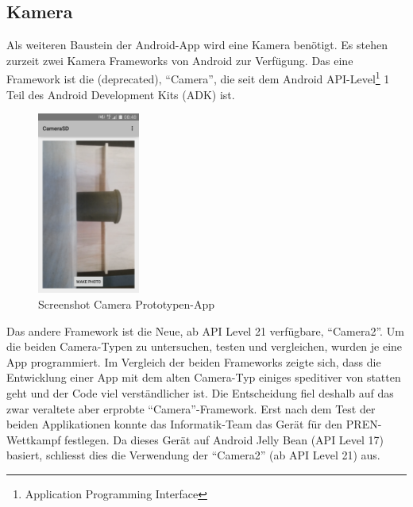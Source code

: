 \subsection{Kamera}
Als weiteren Baustein der Android-App wird eine Kamera benötigt. Es stehen zurzeit 
zwei Kamera Frameworks von Android zur Verfügung. Das eine Framework ist die (deprecated)‚ 
\enquote{Camera}, die seit dem Android API-Level\footnote{Application Programming Interface} 1 Teil des 
Android Development Kits (ADK) ist.
\newline
\begin{figure}[h!]
	\includegraphics[width=0.3\textwidth,clip,trim=0mm 0mm 0mm 0mm]
	{Enddokumentation/Bilder/Screenshot_CameraSD.png}
	\centering
	\caption{Screenshot Camera Prototypen-App}
	\label{abb:ScreenshotCameraSD}
\end{figure}
Das andere Framework ist die Neue, ab API Level 21 verfügbare‚ 
 \enquote{Camera2}. Um die beiden Camera-Typen zu untersuchen, testen und vergleichen, wurden je eine App programmiert.
Im Vergleich der beiden Frameworks zeigte sich, dass die Entwicklung einer App mit dem alten Camera-Typ 
einiges speditiver von statten geht und der Code viel verständlicher ist. Die Entscheidung fiel deshalb 
auf das zwar veraltete aber erprobte  \enquote{Camera}-Framework.
\newline
\newline
Erst nach dem Test der beiden Applikationen konnte das Informatik-Team das Gerät für den PREN-Wettkampf festlegen. 
Da dieses Gerät auf Android Jelly Bean (API Level 17) basiert, schliesst dies die Verwendung 
der  \enquote{Camera2} (ab API Level 21) aus.
